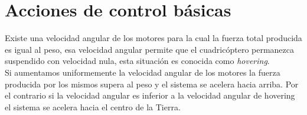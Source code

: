 \documentclass[main]{subfiles}
\begin{document}
\section{Acciones de control b\'asicas}
Existe una velocidad angular de los motores para la cual la fuerza total producida es igual al peso, esa velocidad angular permite que el cuadric\'optero permanezca suspendido con velocidad nula, esta situaci\'on es conocida como \emph{hovering}.\\ Si aumentamos uniformemente la velocidad angular de los motores la fuerza producida por los mismos supera al peso y el sistema se acelera hacia arriba. Por el contrario si la velocidad angular es inferior a la velocidad angular de hovering el sistema se acelera hacia el centro de la Tierra.\\
\begin{figure}
\centering
{}
\end{figure}
\end{document}
